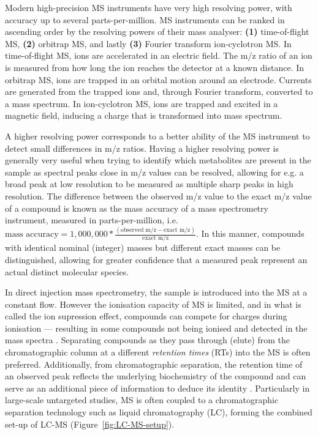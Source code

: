 Modern high-precision MS instruments have very high resolving power, with accuracy up to several parts-per-million. MS instruments can be ranked in ascending order by the resolving powers of their mass analyser: \textbf{(1)} time-of-flight MS, \textbf{(2)} orbitrap MS, and lastly \textbf{(3)} Fourier transform ion-cyclotron MS. In time-of-flight MS, ions are accelerated in an electric field. The m/z ratio of an ion is measured from how long the ion reaches the detector at a known distance. In orbitrap MS, ions are trapped in an orbital motion around an electrode. Currents are generated from the trapped ions and, through Fourier transform, converted to a mass spectrum. In ion-cyclotron MS, ions are trapped and excited in a magnetic field, inducing a charge that is transformed into mass spectrum. 

A higher resolving power corresponds to a better ability of the MS instrument to detect small differences in m/z ratios. Having a higher resolving power is generally very useful when trying to identify which metabolites are present in the sample as spectral peaks close in m/z values can be resolved, allowing for e.g. a broad peak at low resolution to be measured as multiple sharp peaks in high resolution. The difference between the observed m/z value to the exact m/z value of a compound is known as the mass accuracy of a mass spectrometry instrument, measured in parts-per-million, i.e. $\text{mass accuracy} = 1,000,000 * \frac{(\text{observed m/z} - \text{exact m/z})}{\text{exact m/z}}$. In this manner, compounds with identical nominal (integer) masses but different exact masses can be distinguished, allowing for greater confidence that a measured peak represent an actual distinct molecular species. 

In direct injection mass spectrometry, the sample is introduced into the MS at a constant flow. However the ionisation capacity of MS is limited, and in what is called the ion supression effect, compounds can compete for charges during ionisation --- resulting in some compounds not being ionised and detected in the mass spectra \cite{Smith2014}. Separating compounds as they pass through (elute) from the chromatographic column at a different \emph{retention times} (RTs) into the MS is often preferred. Additionally, from chromatographic separation, the retention time of an observed peak reflects the underlying biochemistry of the compound and can serve as an additional piece of information to deduce its identity \cite{Cao2015}. Particularly in large-scale untargeted studies, MS is often coupled to a chromatographic separation technology such as liquid chromatography (LC), forming the combined set-up of LC-MS (Figure~\ref{fig:LC-MS-setup}). 

